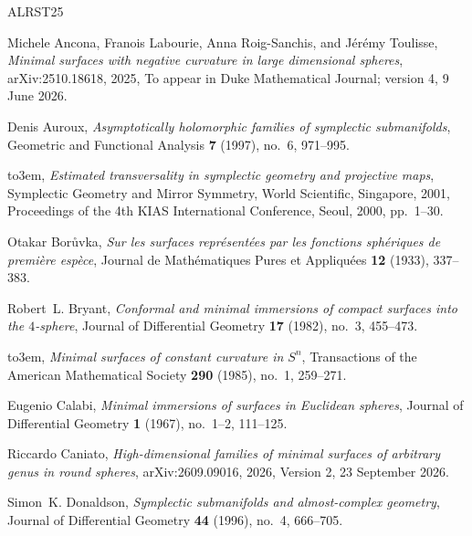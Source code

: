 \documentclass[a4paper,11pt,oneside,reqno]{amsart}
\numberwithin{equation}{section}
\theoremstyle{definition}
\renewcommand{\c}{\mathbb{C}}
\begin{document}
\providecommand{\bysame}{\leavevmode\hbox to3em{\hrulefill}\thinspace}
\providecommand{\MR}{\relax\ifhmode\unskip\space\fi MR }
\providecommand{\MRhref}[2]{%
  \href{http://www.ams.org/mathscinet-getitem?mr=#1}{#2}
}
\providecommand{\href}[2]{#2}
\begin{thebibliography}{ALRST25}

Michele Ancona, Fran{\c{c}}ois Labourie, Anna Roig-Sanchis, and J{\'e}r{\'e}my Toulisse, \emph{Minimal surfaces with negative curvature in large dimensional spheres}, arXiv:2510.18618, 2025, To appear in Duke Mathematical Journal; version 4, 9 June 2026.

Denis Auroux, \emph{Asymptotically holomorphic families of symplectic submanifolds}, Geometric and Functional Analysis \textbf{7} (1997), no.~6, 971--995.

\bysame, \emph{Estimated transversality in symplectic geometry and projective maps}, Symplectic Geometry and Mirror Symmetry, World Scientific, Singapore, 2001, Proceedings of the 4th KIAS International Conference, Seoul, 2000, pp.~1--30.

Otakar Borůvka, \emph{Sur les surfaces repr{\'e}sent{\'e}es par les fonctions sph{\'e}riques de premi{\`e}re esp{\`e}ce}, Journal de Math{\'e}matiques Pures et Appliqu{\'e}es \textbf{12} (1933), 337--383.

Robert~L. Bryant, \emph{Conformal and minimal immersions of compact surfaces into the {$4$}-sphere}, Journal of Differential Geometry \textbf{17} (1982), no.~3, 455--473.

\bysame, \emph{Minimal surfaces of constant curvature in {$S^n$}}, Transactions of the American Mathematical Society \textbf{290} (1985), no.~1, 259--271.

Eugenio Calabi, \emph{Minimal immersions of surfaces in {Euclidean} spheres}, Journal of Differential Geometry \textbf{1} (1967), no.~1--2, 111--125.

Riccardo Caniato, \emph{High-dimensional families of minimal surfaces of arbitrary genus in round spheres}, arXiv:2609.09016, 2026, Version 2, 23 September 2026.

Simon~K. Donaldson, \emph{Symplectic submanifolds and almost-complex geometry}, Journal of Differential Geometry \textbf{44} (1996), no.~4, 666--705.


\end{thebibliography}
\end{document}
